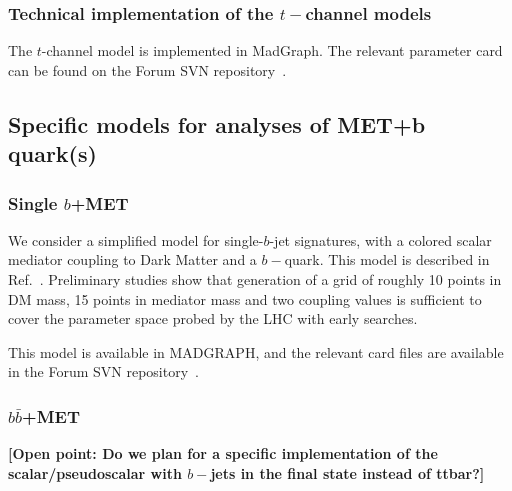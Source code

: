 \documentclass[a4,debug,notitlepage,nobib]{tufte-handout}
\newif\ifATLAS
\newif\ifCMS
\begin{document}
\ifCMS
\textbf{[Open point: Add here implementation details for CMS..]}
\fi

\subsubsection{Technical implementation of the $t-$channel models} 

The $t$-channel model is implemented in MadGraph. 
The relevant parameter card can be found on the Forum
SVN repository~\cite{ForumSVN_TChannel}. 


\ifATLAS
\textbf{[Open point: Add here implementation details for ATLAS.]}
\fi

\ifCMS
\textbf{[Open point: Add here implementation details for CMS..]}
\fi

\subsection{Specific models for analyses of MET+b quark(s)}

\subsubsection{Single $b$+MET}

We consider a simplified model for single-$b$-jet signatures, 
with a colored scalar mediator coupling to Dark Matter and a $b-$quark. 
This model is described in Ref.~\cite{Agrawal:2014una}. Preliminary studies 
show that generation of a grid of roughly 10 points in DM mass, 15 points in mediator
mass and two coupling values is sufficient to cover the parameter
space probed by the LHC with early searches. 

This model is available in MADGRAPH, and the relevant card files are 
available in the Forum SVN repository~\cite{ForumSVN_DMSingleB}.

\subsubsection{$b \bar{b}$+MET}

\textbf{[Open point: Do we plan for a specific implementation of the scalar/pseudoscalar
with $b-$jets in the final state instead of ttbar?]}
\end{document}

